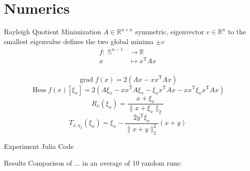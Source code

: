 \documentclass{beamer}
\begin{document}
\section{Numerics}

\begin{frame}{Rayleigh Quotient Minimization}
    $A \in \mathbb{R}^{n \times n}$ symmetric, eigenvector $v \in \mathbb{R}^n$ to the smallest eigenvalue defines the two global minima $\pm v$
    \begin{equation*}
        \begin{split}
            f \colon \; \mathbb{S}^{n-1} & \to \mathbb{R} \\
            x & \mapsto x^{\mathrm{T}} A x
        \end{split}
    \end{equation*} \\[-0.5\baselineskip]
    \begin{equation*}
        \operatorname{grad} f(x) = 2(Ax - x x^{\mathrm{T}} A x)
    \end{equation*}
    \begin{equation*}
        \operatorname{Hess} f(x) [\xi_x] = 2 (A \xi_x - x x^{\mathrm{T}} A \xi_x - \xi_x x^{\mathrm{T}} A x - x x^{\mathrm{T}} \xi_x x^{\mathrm{T}} A x)
    \end{equation*}
    \begin{equation*}
        R_x (\xi_x) = \frac{x + \xi_x}{\lVert x + \xi_x \rVert_2}
    \end{equation*}
    \begin{equation*}
        T_{x, \eta_x}(\xi_x) = \xi_x - \frac{2 y^{\mathrm{T}} \xi_x}{\lVert x + y \rVert^{2}_2} (x + y)
    \end{equation*}
\end{frame}

\begin{frame}{Experiment}
    Julia Code
\end{frame}

\begin{frame}{Results}
    Comparison of ... in an average of 10 random runs:
    \begin{table}[H]
    \end{table}
\end{frame}
\end{document}
